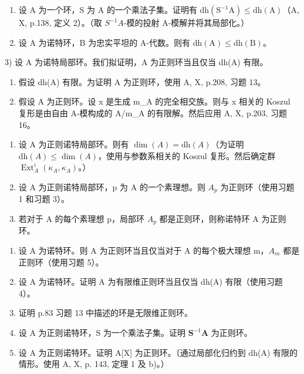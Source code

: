 
\begin{enumerate}
\def\labelenumi{\arabic{enumi})}
\item
  设 A 为一个环，S 为 A 的一个乘法子集。证明有 \(\mathrm{dh}(\mathrm{S}^{-1}\mathrm{A}) \leqslant \mathrm{dh}(\mathrm{A})\)（A, X, p.138, 定义 2）。（取 \(S^{-1}A\)-模的投射 A-模解并将其局部化。）
\item
  设 A 为诺特环，B 为忠实平坦的 A-代数。则有 \(\mathrm{dh(A)}\leqslant \mathrm{dh(B)}\)。
\end{enumerate}

3) 设 A 为诺特局部环。我们拟证明，A 为正则环当且仅当 dh(A) 有限。

\begin{enumerate}
\def\labelenumi{\alph{enumi})}
\tightlist
\item
  假设 dh(A) 有限。为证明 A 为正则环，使用 A, X, p.208, 习题 13。
\item
  假设 A 为正则环。设 x 是生成 m\_A 的完全相交族。则与 x 相关的 Koszul 复形是由自由 A-模构成的 A/m\_A 的有限解。然后应用 A, X, p.203, 习题 16。
\end{enumerate}

\begin{enumerate}
\def\labelenumi{\arabic{enumi})}
\setcounter{enumi}{3}
\item
  设 A 为正则诺特局部环。则有 \(\dim(A) = \mathrm{dh}(A)\)（为证明 \(\mathrm{dh}(A) \leqslant \dim(A)\)，使用与参数系相关的 Koszul 复形。然后确定群 \(\operatorname{Ext}_{A}^{i}(\kappa_{A}, \kappa_{A})\)。）
\item
  设 A 为正则诺特局部环，p 为 A 的一个素理想。则 \(A_{p}\) 为正则环（使用习题 1 和习题 3）。
\item
  若对于 A 的每个素理想 p，局部环 \(A_{p}\) 都是正则环，则称诺特环 A 为正则环。
\end{enumerate}

\begin{enumerate}
\def\labelenumi{\alph{enumi})}
\item
  设 A 为诺特环。则 A 为正则环当且仅当对于 A 的每个极大理想 m，\(A_{m}\) 都是正则环（使用习题 5）。
\item
  设 A 为诺特环。证明 A 为有限维正则环当且仅当 dh(A) 有限（使用习题 4）。
\item
  证明 p.83 习题 13 中描述的环是无限维正则环。
\item
  设 A 为正则诺特环，S 为一个乘法子集。证明 \(\mathbf{S}^{-1}\mathbf{A}\) 为正则环。
\item
  设 A 为正则诺特环。证明 A{[}X{]} 为正则环。（通过局部化归约到 dh(A) 有限的情形。使用 A, X, p. 143, 定理 1 及 b)。）
\end{enumerate}

